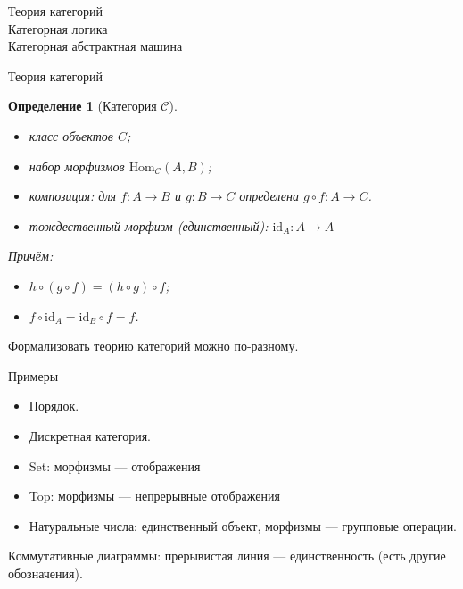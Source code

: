 \documentclass[aspectratio=169,dvipsnames,usenames]{beamer}
\begin{document}
\newtheorem{dfn}{Определение}[section]
\newtheorem{nte}{Замечание}[section]

\newtheorem{axiom}{Аксиома}[section]
\newtheorem{thm}{Теорема}[section]
\newtheorem{lmm}[theorem]{Лемма}
\newtheorem{statement}{Утверждение}[section]
\newtheorem{oun_paragraph}{Пункт}[section]
\newtheorem{cons}{Следствие}[section]
\newtheorem*{exm}{Пример}

\newcommand{\comb}[1]{\operatorname{\mathcal{#1}}}
\newcommand{\func}[1]{\operatorname{#1}}
\newcommand{\reduction}[1]{{\color{OrangeRed}#1}}
\newcommand{\set}[1]{\left\{#1\right\}}

\def\from#1{\par \parbox{0.7\textwidth}{\par \hfill\raggedleft \it #1}} 

\begin{frame}{}
\begin{center}
{\LARGE Теория категорий\\Категорная логика\\Категорная абстрактная машина}
\end{center}
\end{frame}

\begin{frame}{Теория категорий}
\begin{dfn}[Категория $\mathcal{C}$]
\begin{itemize}
\item класс объектов $C$;
\item набор морфизмов $\text{Hom}_\mathcal{C}(A,B)$;
\item композиция: для $f: A \rightarrow B$ и $g: B \rightarrow C$ определена $g \circ f: A \rightarrow C$.
\item тождественный морфизм (единственный): $\text{id}_A: A \rightarrow A$
\end{itemize}

Причём:
\begin{itemize}
\item $h \circ (g \circ f) = (h \circ g) \circ f$;
\item $f \circ \text{id}_A = \text{id}_B \circ f = f$.
\end{itemize}
\end{dfn}

Формализовать теорию категорий можно по-разному.
\end{frame}

\begin{frame}{Примеры}
\begin{itemize}
\item Порядок.
\item Дискретная категория.
\item Set: морфизмы --- отображения
\item Top: морфизмы --- непрерывные отображения
\item Натуральные числа: единственный объект, морфизмы --- групповые операции.
\end{itemize}

Коммутативные диаграммы: прерывистая линия --- единственность (есть другие обозначения).
\end{frame}
\end{document}
